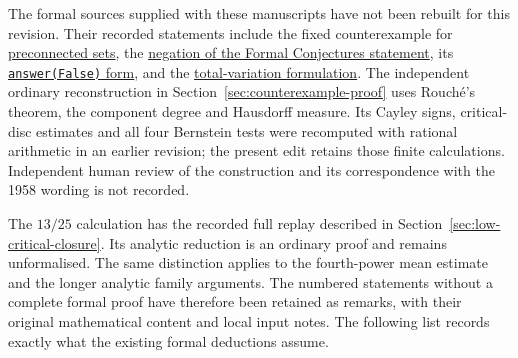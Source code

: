 \documentclass[11pt]{article}
\begin{document}
The formal sources supplied with these manuscripts have not been rebuilt
for this revision. Their recorded statements include the fixed
counterexample for
\href{https://github.com/wcook04/plectis-erdos/blob/7380b7871687b6bcc41ca0143c61f232e8af6500/lean/ErdosProblems/Erdos1041/Counterexample/HausdorffLength.lean\#L283}{preconnected sets},
the
\href{https://github.com/wcook04/plectis-erdos/blob/7380b7871687b6bcc41ca0143c61f232e8af6500/lean/ErdosProblems/Erdos1041/Counterexample/HausdorffLength.lean\#L407}{negation of the Formal Conjectures statement},
its
\href{https://github.com/wcook04/plectis-erdos/blob/7380b7871687b6bcc41ca0143c61f232e8af6500/lean/ErdosProblems/Erdos1041/Counterexample/HausdorffLength.lean\#L449}{\texttt{answer(False)} form},
and the
\href{https://github.com/wcook04/plectis-erdos/blob/f70679d47178bf1174309cb29f5b31748609cc04/lean/ErdosProblems/Erdos1041/Counterexample/CatalogueAdapter.lean\#L25}{total-variation formulation}.
The independent ordinary reconstruction in
Section~\ref{sec:counterexample-proof} uses Rouch\'e's theorem, the
component degree and Hausdorff measure. Its Cayley signs, critical-disc
estimates and all four Bernstein tests were recomputed with rational
arithmetic in an earlier revision; the present edit retains those
finite calculations. Independent human review of the construction and its
correspondence with the 1958 wording is not recorded.

The $13/25$ calculation has the recorded full replay described in
Section~\ref{sec:low-critical-closure}. Its analytic reduction is an
ordinary proof and remains unformalised. The same distinction applies
to the fourth-power mean estimate and the longer analytic family
arguments. The numbered statements without a complete formal proof
have therefore been retained as remarks, with their original
mathematical content and local input notes. The following list records
exactly what the existing formal deductions assume.
\end{document}
